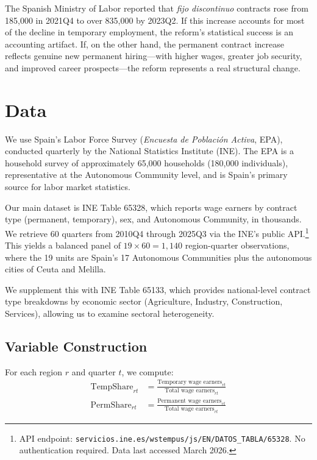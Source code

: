 \documentclass[12pt]{article}
\begin{document}
The Spanish Ministry of Labor reported that \emph{fijo discontinuo} contracts rose from 185,000 in 2021Q4 to over 835,000 by 2023Q2. If this increase accounts for most of the decline in temporary employment, the reform's statistical success is an accounting artifact. If, on the other hand, the permanent contract increase reflects genuine new permanent hiring---with higher wages, greater job security, and improved career prospects---the reform represents a real structural change.


\section{Data}
\label{sec:data}

We use Spain's Labor Force Survey (\emph{Encuesta de Poblaci\'{o}n Activa}, EPA), conducted quarterly by the National Statistics Institute (INE). The EPA is a household survey of approximately 65,000 households (180,000 individuals), representative at the Autonomous Community level, and is Spain's primary source for labor market statistics.

Our main dataset is INE Table 65328, which reports wage earners by contract type (permanent, temporary), sex, and Autonomous Community, in thousands. We retrieve 60 quarters from 2010Q4 through 2025Q3 via the INE's public API.\footnote{API endpoint: \texttt{servicios.ine.es/wstempus/js/EN/DATOS\_TABLA/65328}. No authentication required. Data last accessed March 2026.} This yields a balanced panel of $19 \times 60 = 1{,}140$ region-quarter observations, where the 19 units are Spain's 17 Autonomous Communities plus the autonomous cities of Ceuta and Melilla.

We supplement this with INE Table 65133, which provides national-level contract type breakdowns by economic sector (Agriculture, Industry, Construction, Services), allowing us to examine sectoral heterogeneity.

\subsection{Variable Construction}

For each region $r$ and quarter $t$, we compute:
\begin{align}
\text{TempShare}_{rt} &= \frac{\text{Temporary wage earners}_{rt}}{\text{Total wage earners}_{rt}} \\
\text{PermShare}_{rt} &= \frac{\text{Permanent wage earners}_{rt}}{\text{Total wage earners}_{rt}}
\end{align}
\end{document}
